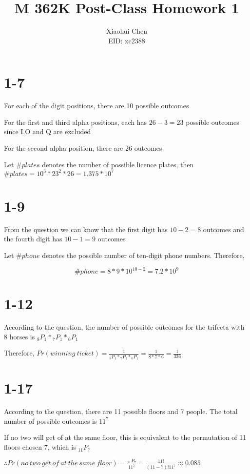 \documentclass[12pt]{article}
\author{Xiaohui Chen \\EID: xc2388}
\title{M 362K Post-Class Homework 1}
\begin{document}
\maketitle
\begin{spacing}{2.0}

\section*{1-7}
For each of the digit positions, there are 10 possible outcomes

For the first and third alpha positions, each has $26-3=23$ possible outcomes since I,O and Q are excluded

For the second alpha position, there are 26 outcomes

Let $\#plates$ denotes the number of possible licence plates, then $\#plates= 10^{3}* 23^{2} * 26= 1.375*10^{7}$

\section*{1-9}
From the question we can know that the first digit has $10-2=8$ outcomes and the fourth digit has $10-1=9$ outcomes

Let $\#phone$ denotes the possible number of ten-digit phone numbers. Therefore,

$$\#phone=8*9*10^{10-2}=7.2*10^{9}$$

\section*{1-12}
According to the question, the number of possible outcomes for the trifeeta with 8 horses is ${}_{8}P_{1} *{}_{7}P_{1} * {}_{6}P_{1}$

Therefore, $Pr(winning\ ticket)=\frac{1}{{}_{8}P_{1} *{}_{7}P_{1} * {}_{6}P_{1}}=\frac{1}{8*7*6}= \frac{1}{336}$

\section*{1-17}
According to the question, there are 11 possible floors and 7 people. The total number of possible outcomes is $11^{7}$

If no two will get of at the same floor, this is equivalent to the permutation of 11 floors chosen 7, which is ${}_{11}P_{7}$

$\therefore Pr(no\ two\ get\ of\ at\ the\ same\ floor)= \frac{{}_{11}P_{7}}{11^7}= \frac{11!}{(11-7)! 11^7}\approx 0.085$


\end{spacing}
\end{document}
